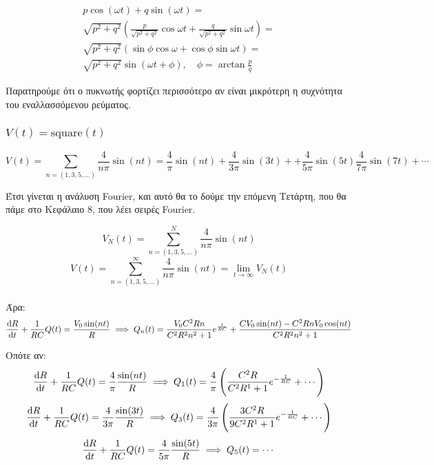 \documentclass[11pt,a4paper,titlepage,draft]{article}
\begin{document}
\begin{attnbox}{}
\begin{align*}
p \cos (\omega t) + q \sin (\omega t) = \\
\sqrt{p^2+q^2} \left( \frac{p}{\sqrt{p^2+q^2}} \cos \omega t+ \frac{q}{\sqrt{p^2+q^2}} \sin \omega t \right) = \\
\sqrt{p^2+q^2} \left ( \sin \phi \cos \omega + \cos \phi \sin \omega t \right) = \\
\sqrt{p^2+q^2} \sin ( \omega t + \phi ), \quad \phi = \arctan \frac{p}{q}
\end{align*}
\end{attnbox}

Παρατηρούμε ότι ο πυκνωτής φορτίζει περισσότερο αν είναι μικρότερη η συχνότητα του εναλλασσόμενου ρεύματος.

\subsubsection{\(V(t) = \mathrm{square}(t)\)}

\[
V(t)= \sum _{n = (1,3,5,\dots)} \frac{4}{n \pi} \sin (n t) =
\frac{4}{ \pi} \sin (n t) + \frac{4}{3 \pi} \sin (3 t) +
+ \frac{4}{5 \pi} \sin (5 t) \frac{4}{7 \pi} \sin (7 t) + \cdots
\]

Έτσι γίνεται η ανάλυση \textlatin{Fourier}, και αυτό θα το δούμε την επόμενη Τετάρτη, που θα πάμε στο Κεφάλαιο 8, που λέει σειρές \textlatin{Fourier}.

\[
V_N(t) = \sum _{n = (1,3,5,\dots)}^N \frac{4}{n \pi} \sin (n t)
\]
\[
V(t) = \sum _{n = (1,3,5,\dots)}^\infty \frac{4}{n \pi} \sin (n t) = \lim_{t \to \infty} V_N(t)
\]

\paragraph{}
Άρα:
\[
 \frac{\dif R}{\dif t}  + \frac{1}{RC}Q(t) = \frac{V_0 \sin (nt)}{R} \implies
 Q_n(t) = \frac{V_0C^2Rn}{C^2R^2n^2+1}e^{\frac{t}{RC}} + \frac{CV_0\sin (nt) - C^2RnV_0 \cos (nt)}{C^2R^2n^2+1}
\]

Οπότε αν:
\[
 \frac{\dif R}{\dif t}  + \frac{1}{RC}Q(t) = \frac{4}{\pi} \frac{\sin (nt)}{R} \implies
 Q_1(t) = \frac{4}{\pi} \left( \frac{C^2R}{C^2R^1+1} e^{-\frac{1}{RC}}+ \cdots \right)
\]
\[
 \frac{\dif R}{\dif t}  + \frac{1}{RC}Q(t) = \frac{4}{3\pi} \frac{\sin (3t)}{R} \implies
 Q_3(t) = \frac{4}{3\pi} \left( \frac{3C^2R}{9C^2R^1+1} e^{-\frac{1}{RC}}+ \cdots \right)
\]
\[
 \frac{\dif R}{\dif t}  + \frac{1}{RC}Q(t) = \frac{4}{5\pi} \frac{\sin (5t)}{R} \implies
 Q_5(t) = \cdots
\]
\end{document}
